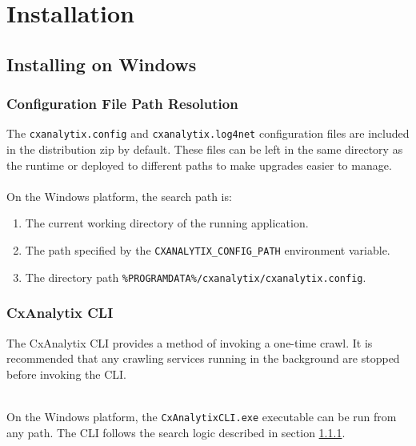 \chapter{Installation}

\newcommand{\configstmt}[2]{
\subsection{Configuration File Path Resolution}\label{plat:#1}
    
The \texttt{cxanalytix.config} and \texttt{cxanalytix.log4net} configuration files are included in the distribution zip by default.  These
files can be left in the same directory as the runtime or deployed to different paths to make upgrades easier to manage.\\

\noindent\\On the #1 platform, the search path is:\\
\begin{enumerate}
    \item The current working directory of the running application.
    \item The path specified by the \texttt{CXANALYTIX\_CONFIG\_PATH} environment variable.
    \item The directory path \texttt{#2}.
\end{enumerate}
}

\newcommand{\clistmt}[2]{
    \subsection{CxAnalytix CLI}
    The CxAnalytix CLI provides a method of invoking a one-time crawl.  It is recommended that any crawling services running in the background
    are stopped before invoking the CLI.

    \noindent\\On the #1 platform, the \texttt{CxAnalytixCLI#2} executable can be run from any path.  The CLI follows the search logic described in section \ref{plat:#1}.
}


\section{Installing on Windows}
\newcommand{\windowsconfigpathbase}{\%PROGRAMDATA\%/cxanalytix}
\newcommand{\windowsconfigpath}{\windowsconfigpathbase/cxanalytix.config}
\configstmt{Windows}{\windowsconfigpath}
\clistmt{Windows}{.exe}

